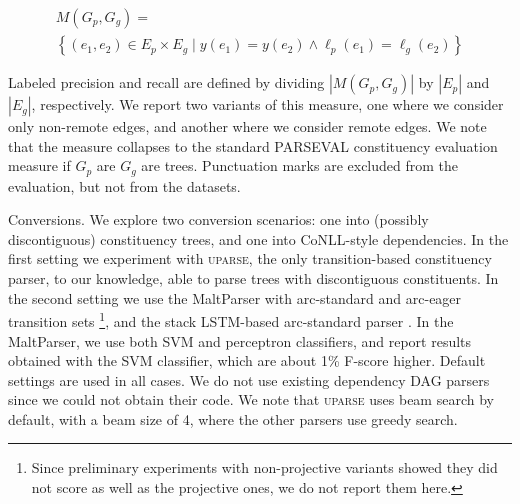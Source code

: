\documentclass[11pt]{article}
\makeatletter
\renewcommand{\paragraph}{
  \@startsection{paragraph}{4}
  {\z@}{.5ex \@plus .5ex \@minus .2ex}{-1em}
  {\normalfont\normalsize\bfseries}
}
\makeatother
\begin{document}
\vspace{-.6cm}

{\small
\begin{multline*}
    M(G_p,G_g) = \\
    \left\{(e_1,e_2) \in E_p \times E_g \;|\;
    y(e_1) = y(e_2) \wedge \ell_p(e_1)=\ell_g(e_2)\right\}
\end{multline*}
}

\vspace{-.6cm}

Labeled precision and recall are defined by dividing $|M(G_p,G_g)|$ by $|E_p|$ and $|E_g|$, respectively.
We report two variants of this measure, one where we consider only non-remote edges,
and another where we consider remote edges. We note that the measure collapses to the standard
PARSEVAL constituency evaluation measure if $G_p$ are $G_g$ are trees.
Punctuation marks are excluded from the evaluation, but not from the datasets.


\paragraph{Conversions.}
We explore two conversion scenarios: one into (possibly discontiguous) constituency trees,
and one into CoNLL-style dependencies. In the first setting we experiment with \textsc{uparse},
the only transition-based constituency parser, to our knowledge, able to parse trees with
discontiguous constituents.
In the second setting we use the MaltParser with arc-standard and
arc-eager transition sets \cite{nivre2007maltparser}\footnote{Since preliminary
experiments with non-projective variants showed they did not score as well as the
projective ones, we do not report them here.},
and the stack LSTM-based arc-standard parser \cite{dyer2015transition}.
In the MaltParser, we use both SVM and perceptron classifiers, and report
results obtained with the SVM classifier, which are about 1\% F-score higher.
Default settings are used in all cases.
We do not use existing dependency DAG parsers since we could not obtain their code.
We note that \textsc{uparse} uses beam search by default,
with a beam size of 4, where the other parsers use greedy search.

\end{document}
